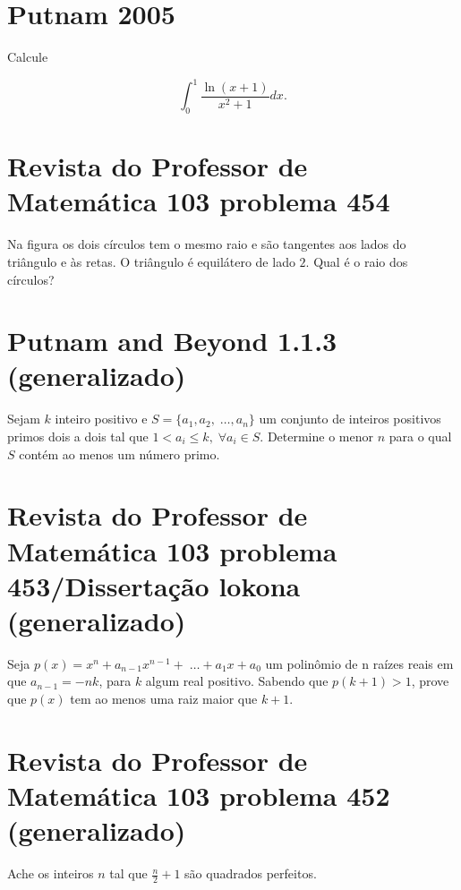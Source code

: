 \section{Putnam 2005}

Calcule

$$\int_0^1\frac{\ln(x+1)}{x^2+1}dx.$$

\section{Revista do Professor de Matemática 103 problema 454}

Na figura os dois círculos tem o mesmo raio e são tangentes aos lados do triângulo e às retas. O triângulo é equilátero de lado $2$. Qual é o raio dos círculos?

\begin{center}
\end{center}

\section{Putnam and Beyond 1.1.3 (generalizado)}

Sejam $k$ inteiro positivo e $S = \{a_1,a_2,\;\dots,a_n\}$ um conjunto de inteiros positivos primos dois a dois tal que $1<a_i\le k,\; \forall a_i\in S$. Determine o menor $n$ para o qual $S$ contém ao menos um número primo.

\section{Revista do Professor de Matemática 103 problema 453/Dissertação lokona (generalizado)}

Seja $p(x) = x^n + a_{n-1} x^{n-1}+\;\dots+a_1x+a_0$ um polinômio de n raízes reais em que $a_{n-1} = -nk$, para $k$ algum real positivo. Sabendo que $p(k+1) > 1$, prove que $p(x)$ tem ao menos uma raiz maior que $k+1$. 

\section{Revista do Professor de Matemática 103 problema 452 (generalizado)}

Ache os inteiros $n$ tal que $\frac n2 +1$ são quadrados perfeitos.